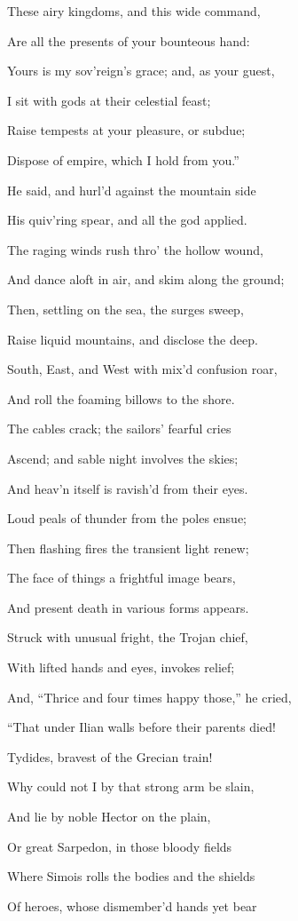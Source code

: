These airy kingdoms, and this wide command,

Are all the presents of your bounteous hand:

Yours is my sov’reign’s grace; and, as your guest,

I sit with gods at their celestial feast;

Raise tempests at your pleasure, or subdue;

Dispose of empire, which I hold from you.”

He said, and hurl’d against the mountain side

His quiv’ring spear, and all the god applied.

The raging winds rush thro’ the hollow wound,

And dance aloft in air, and skim along the ground;

Then, settling on the sea, the surges sweep,

Raise liquid mountains, and disclose the deep.

South, East, and West with mix’d confusion roar,

And roll the foaming billows to the shore.

The cables crack; the sailors’ fearful cries

Ascend; and sable night involves the skies;

And heav’n itself is ravish’d from their eyes.

Loud peals of thunder from the poles ensue;

Then flashing fires the transient light renew;

The face of things a frightful image bears,

And present death in various forms appears.

Struck with unusual fright, the Trojan chief,

With lifted hands and eyes, invokes relief;

And, “Thrice and four times happy those,” he cried,

“That under Ilian walls before their parents died!

Tydides, bravest of the Grecian train!

Why could not I by that strong arm be slain,

And lie by noble Hector on the plain,

Or great Sarpedon, in those bloody fields

Where Simois rolls the bodies and the shields

Of heroes, whose dismember’d hands yet bear

